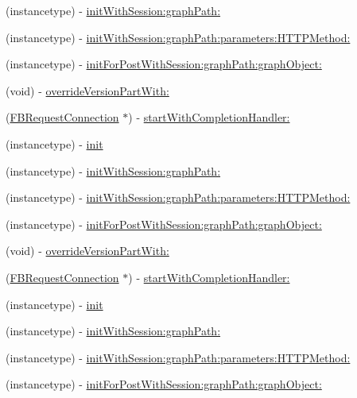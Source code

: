 \begin{DoxyCompactItemize}
(instancetype) -\/ \hyperlink{interfaceFBRequest_abf08647708e28e2fe5422e90680bd9dc}{init\+With\+Session\+:graph\+Path\+:}
\item 
(instancetype) -\/ \hyperlink{interfaceFBRequest_a4710201ef3004494a71f530a36df3e0b}{init\+With\+Session\+:graph\+Path\+:parameters\+:\+H\+T\+T\+P\+Method\+:}
\item 
(instancetype) -\/ \hyperlink{interfaceFBRequest_a9cf5a9bb6a0d519efb2127ffeb0da2e8}{init\+For\+Post\+With\+Session\+:graph\+Path\+:graph\+Object\+:}
\item 
(void) -\/ \hyperlink{interfaceFBRequest_a96f27df0edb3e41045bf5ba9ede2431c}{override\+Version\+Part\+With\+:}
\item 
(\hyperlink{interfaceFBRequestConnection}{F\+B\+Request\+Connection} $\ast$) -\/ \hyperlink{interfaceFBRequest_a40af16a9b68d4e08abd9e022b94df6f0}{start\+With\+Completion\+Handler\+:}
\item 
(instancetype) -\/ \hyperlink{interfaceFBRequest_a9e753030844abe92959a169b508f0a2b}{init}
\item 
(instancetype) -\/ \hyperlink{interfaceFBRequest_abf08647708e28e2fe5422e90680bd9dc}{init\+With\+Session\+:graph\+Path\+:}
\item 
(instancetype) -\/ \hyperlink{interfaceFBRequest_a4710201ef3004494a71f530a36df3e0b}{init\+With\+Session\+:graph\+Path\+:parameters\+:\+H\+T\+T\+P\+Method\+:}
\item 
(instancetype) -\/ \hyperlink{interfaceFBRequest_a9cf5a9bb6a0d519efb2127ffeb0da2e8}{init\+For\+Post\+With\+Session\+:graph\+Path\+:graph\+Object\+:}
\item 
(void) -\/ \hyperlink{interfaceFBRequest_a96f27df0edb3e41045bf5ba9ede2431c}{override\+Version\+Part\+With\+:}
\item 
(\hyperlink{interfaceFBRequestConnection}{F\+B\+Request\+Connection} $\ast$) -\/ \hyperlink{interfaceFBRequest_a40af16a9b68d4e08abd9e022b94df6f0}{start\+With\+Completion\+Handler\+:}
\item 
(instancetype) -\/ \hyperlink{interfaceFBRequest_a9e753030844abe92959a169b508f0a2b}{init}
\item 
(instancetype) -\/ \hyperlink{interfaceFBRequest_abf08647708e28e2fe5422e90680bd9dc}{init\+With\+Session\+:graph\+Path\+:}
\item 
(instancetype) -\/ \hyperlink{interfaceFBRequest_a4710201ef3004494a71f530a36df3e0b}{init\+With\+Session\+:graph\+Path\+:parameters\+:\+H\+T\+T\+P\+Method\+:}
\item 
(instancetype) -\/ \hyperlink{interfaceFBRequest_a9cf5a9bb6a0d519efb2127ffeb0da2e8}{init\+For\+Post\+With\+Session\+:graph\+Path\+:graph\+Object\+:}

\end{DoxyCompactItemize}

